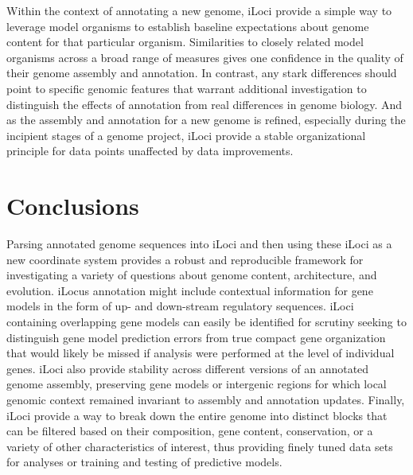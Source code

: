 Within the context of annotating a new genome, iLoci provide a simple way to leverage model organisms to establish baseline expectations about genome content for that particular organism.
Similarities to closely related model organisms across a broad range of measures gives one confidence in the quality of their genome assembly and annotation.
In contrast, any stark differences should point to specific genomic features that warrant additional investigation to distinguish the effects of annotation from real differences in genome biology.
And as the assembly and annotation for a new genome is refined, especially during the incipient stages of a genome project, iLoci provide a stable organizational principle for data points unaffected by data improvements.







\section{Conclusions}

Parsing annotated genome sequences into iLoci and then using these iLoci as a new coordinate system provides a robust and reproducible framework for investigating a variety of questions about genome content, architecture, and evolution.
iLocus annotation might include contextual information for gene models in the form of up- and down-stream regulatory sequences.
iLoci containing overlapping gene models can easily be identified for scrutiny seeking to distinguish gene model prediction errors from true compact gene organization that would likely be missed if analysis were performed at the level of individual genes.
iLoci also provide stability across different versions of an annotated genome assembly, preserving gene models or intergenic regions for which local genomic context remained invariant to assembly and annotation updates.
Finally, iLoci provide a way to break down the entire genome into distinct blocks that can be filtered based on their composition, gene content, conservation, or a variety of other characteristics of interest, thus providing finely tuned data sets for analyses or training and testing of predictive models.


\newpage
